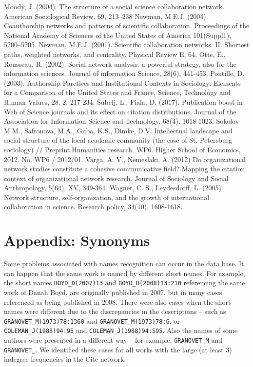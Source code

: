 \documentclass[11pt]{article} %
\begin{document}
\begin{thebibliography}{99}
   Moody, J. (2004). The structure of a social science collaboration network. American Sociological Review, 69, 213–238
   Newman, M.E.J. (2004). Coauthorship networks and patterns of scientific collaboration. Proceedings of the National Academy of Sciences of the United States of America 101(Suppl1), 5200–5205. 
   Newman, M.E.J. (2001). Scientific collaboration networks. II. Shortest paths, weighted networks, and centrality. Physical Review E, 64. 
   Otte, E., Rousseau, R. (2002). Social network analysis: a powerful strategy, also for the information sciences. Journal of information Science, 28(6), 441-453. 
   Pontille, D. (2003). Authorship Parctices and Institutional Contexts in Sociology: Elements for a Comparison of the United States and France, Science, Technology and Human Values, 28, 2, 217-234.
   Šubelj, L., Fiala, D. (2017). Publication boost in Web of Science journals and its effect on citation distributions. Journal of the Association for Information Science and Technology, 68(4), 1018-1023.
   Sokolov M.M., Safronova, M.A., Guba, K.S., Dimke, D.V. Intellectual landscape and social structure of the local academic community (the case of St. Petersburg sociology) // Preprint.Humanities research. WP6. Higher School of Economics, 2012. No. WP6 / 2012/01.
   Varga, A. V., Nemeslaki, A. (2012) Do organizational network studies constitute a cohesive communicative field? Mapping the citation context of organizational network research. Journal of Sociology and Social Anthropology, 5(64), XV, 349-364. 
   Wagner, C. S.,  Leydesdorff, L. (2005). Network structure, self-organization, and the growth of international collaboration in science. Research policy, 34(10), 1608-1618.   
\end{thebibliography}   

\appendix
\section{Appendix: Synonyms}

Some problems associated with names recognition can occur in the data base. It can happen that the same work is named by different short names. For example, the short names \texttt {BOYD\_D(2007)13} and \texttt {BOYD\_D(2008)13:210} referencing the same work of Danah Boyd, are originally published in 2007, but in many cases referenced as being published in 2008. There were also cases when the short names were different due to the discrepancies in the descriptions -- such as \texttt{GRANOVET\_M(1973)78:1360} and \texttt{GRANOVET\_M(1973)78:6}, or \texttt{COLEMAN\_J(1988)94:95} and \texttt{COLEMAN\_J(1988)94:S95}. Also the names of some authors were presented in a different way -- for example, \texttt{GRANOVET\_M} and \texttt{GRANOVET\_}. We identified these cases for all works with the large (at least 3) indegree frequencies in the Cite network.\medskip 
\end{document}
